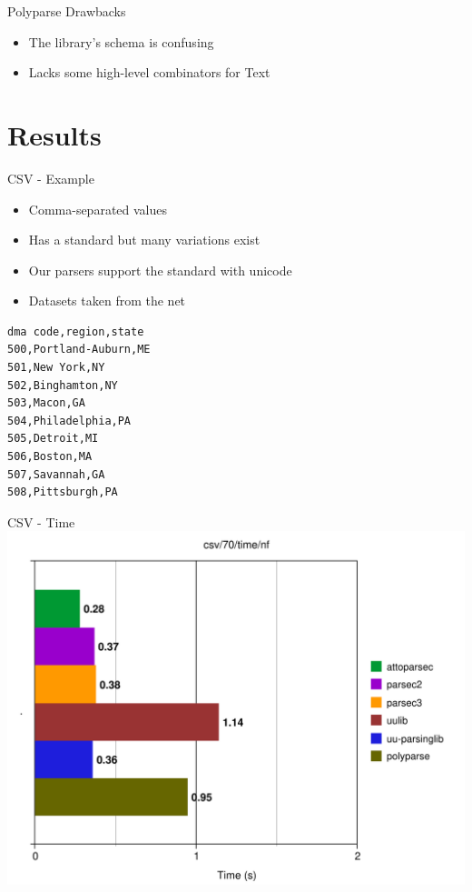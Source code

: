 \documentclass{beamer}
\begin{document}
\begin{frame}{Polyparse Drawbacks}
\begin{itemize}
\item The library's schema is confusing
\item Lacks some high-level combinators for Text
\end{itemize}
\end{frame}

\section{Results}

\begin{frame}[fragile]{CSV - Example}
\begin{itemize}
\item Comma-separated values
\item Has a standard but many variations exist
\item Our parsers support the standard with unicode
\item Datasets taken from the net
\end{itemize}
\begin{verbatim}
dma code,region,state
500,Portland-Auburn,ME
501,New York,NY
502,Binghamton,NY
503,Macon,GA
504,Philadelphia,PA
505,Detroit,MI
506,Boston,MA
507,Savannah,GA
508,Pittsburgh,PA
\end{verbatim}
\end{frame}

\begin{frame}{CSV - Time}
\includegraphics[scale=0.5]{presentation/csv-70-time-nf.pdf}
\end{frame}
\end{document}
